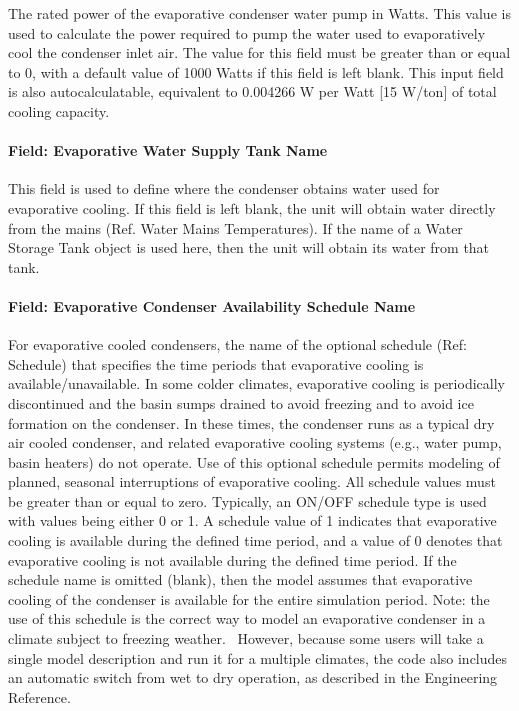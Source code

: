 The rated power of the evaporative condenser water pump in Watts. This value is used to calculate the power required to pump the water used to evaporatively cool the condenser inlet air. The value for this field must be greater than or equal to 0, with a default value of 1000 Watts if this field is left blank. This input field is also autocalculatable, equivalent to 0.004266 W per Watt {[}15 W/ton{]} of total cooling capacity.

\paragraph{Field: Evaporative Water Supply Tank Name}\label{field-evaporative-water-supply-tank-name-1}

This field is used to define where the condenser obtains water used for evaporative cooling. If this field is left blank, the unit will obtain water directly from the mains (Ref. Water Mains Temperatures). If the name of a Water Storage Tank object is used here, then the unit will obtain its water from that tank.

\paragraph{Field: Evaporative Condenser Availability Schedule Name}\label{field-evaporative-condenser-availability-schedule-name-1}

For evaporative cooled condensers, the name of the optional schedule (Ref: Schedule) that specifies the time periods that evaporative cooling is available/unavailable. In some colder climates, evaporative cooling is periodically discontinued and the basin sumps drained to avoid freezing and to avoid ice formation on the condenser. In these times, the condenser runs as a typical dry air cooled condenser, and related evaporative cooling systems (e.g., water pump, basin heaters) do not operate. Use of this optional schedule permits modeling of planned, seasonal interruptions of evaporative cooling. All schedule values must be greater than or equal to zero. Typically, an ON/OFF schedule type is used with values being either 0 or 1. A schedule value of 1 indicates that evaporative cooling is available during the defined time period, and a value of 0 denotes that evaporative cooling is not available during the defined time period. If the schedule name is omitted (blank), then the model assumes that evaporative cooling of the condenser is available for the entire simulation period. Note: the use of this schedule is the correct way to model an evaporative condenser in a climate subject to freezing weather.~ However, because some users will take a single model description and run it for a multiple climates, the code also includes an automatic switch from wet to dry operation, as described in the Engineering Reference.

